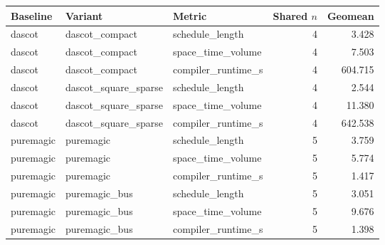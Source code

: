 \begin{tabular}{lllrr}
\hline
Baseline & Variant & Metric & Shared $n$ & Geomean \\
\hline
dascot & dascot\_compact & schedule\_length & 4 & 3.428 \\
dascot & dascot\_compact & space\_time\_volume & 4 & 7.503 \\
dascot & dascot\_compact & compiler\_runtime\_s & 4 & 604.715 \\
dascot & dascot\_square\_sparse & schedule\_length & 4 & 2.544 \\
dascot & dascot\_square\_sparse & space\_time\_volume & 4 & 11.380 \\
dascot & dascot\_square\_sparse & compiler\_runtime\_s & 4 & 642.538 \\
puremagic & puremagic & schedule\_length & 5 & 3.759 \\
puremagic & puremagic & space\_time\_volume & 5 & 5.774 \\
puremagic & puremagic & compiler\_runtime\_s & 5 & 1.417 \\
puremagic & puremagic\_bus & schedule\_length & 5 & 3.051 \\
puremagic & puremagic\_bus & space\_time\_volume & 5 & 9.676 \\
puremagic & puremagic\_bus & compiler\_runtime\_s & 5 & 1.398 \\
\hline
\end{tabular}
